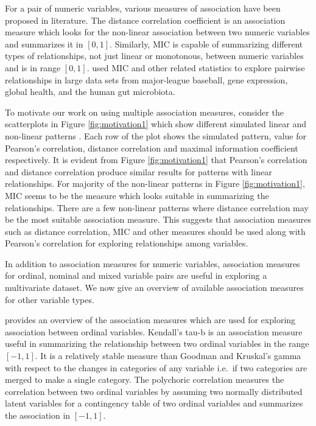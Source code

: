 For a pair of numeric variables, various measures of association have
been proposed in literature. The distance correlation coefficient
\citep{szekely2007measuring} is an association measure which looks for
the non-linear association between two numeric variables and summarizes
it in \([0,1]\). Similarly, MIC \citep{reshef2011detecting} is capable
of summarizing different types of relationships, not just linear or
monotonous, between numeric variables and is in range \([0,1]\).
\citet{reshef2011detecting} used MIC and other related statistics to
explore pairwise relationships in large data sets from major-league
baseball, gene expression, global health, and the human gut microbiota.

To motivate our work on using multiple association measures, consider
the scatterplots in Figure \ref{fig:motivation1} which show different
simulated linear and non-linear patterns . Each row of the plot shows
the simulated pattern, value for Pearson's correlation, distance
correlation and maximal information coefficient respectively. It is
evident from Figure \ref{fig:motivation1} that Pearson's correlation and
distance correlation produce similar results for patterns with linear
relationships. For majority of the non-linear patterns in Figure
\ref{fig:motivation1}, MIC seems to be the measure which looks suitable
in summarizing the relationships. There are a few non-linear patterns
where distance correlation may be the most suitable association measure.
This suggests that association measures such as distance correlation,
MIC and other measures should be used along with Pearson's correlation
for exploring relationships among variables.

In addition to association measures for numeric variables, association
measures for ordinal, nominal and mixed variable pairs are useful in
exploring a multivariate dataset. We now give an overview of available
association measures for other variable types.

\citet{agresti2010analysis} provides an overview of the association
measures which are used for exploring association between ordinal
variables. Kendall's tau-b \citep{kendall1945treatment} is an
association measure useful in summarizing the relationship between two
ordinal variables in the range \([-1,1]\). It is a relatively stable
measure than Goodman and Kruskal's gamma with respect to the changes in
categories of any variable i.e.~if two categories are merged to make a
single category. The polychoric correlation \citep{olsson1979maximum}
measures the correlation between two ordinal variables by assuming two
normally distributed latent variables for a contingency table of two
ordinal variables and summarizes the association in \([-1,1]\).

